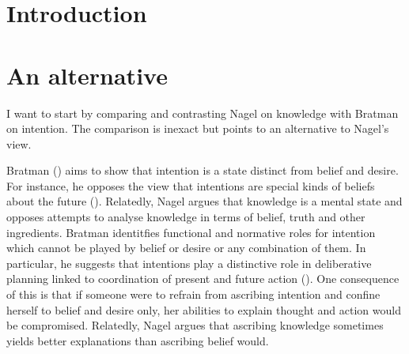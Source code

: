 \documentclass[11pt,a4paper]{extarticle}
\begin{document}
\setlength\footnotesep{1em}




\maketitle

\begin{abstract}
\noindent
***


\end{abstract}




\section{Introduction}


\section{An alternative}
I want to start by
comparing and contrasting
Nagel on knowledge
with 
Bratman on intention.
The comparison is inexact but points to an alternative to Nagel's view.

Bratman
(\citeyear{bratman_faces_1999,Bratman:1987xw})
aims to show that intention is a state distinct from  belief and desire.
For instance, he opposes the view that intentions are special kinds of beliefs about the future (\citeyear[pp.\ 257ff]{bratman_faces_1999}).
Relatedly, Nagel argues that knowledge is a mental state and
opposes attempts to analyse knowledge in terms of belief, truth and other ingredients.
Bratman identitfies functional and normative roles for intention which cannot be played by belief or desire or any combination of them.
In particular, he suggests that intentions play a distinctive role in deliberative planning linked to coordination of present and future action
(\citeyear[p.\ 223]{bratman_faces_1999}).
One consequence of this is that if someone were to refrain from ascribing intention and confine herself to belief and desire only, her abilities to explain thought and action would be compromised.
Relatedly, Nagel argues that ascribing knowledge sometimes yields  better explanations than ascribing belief would.
\end{document}
